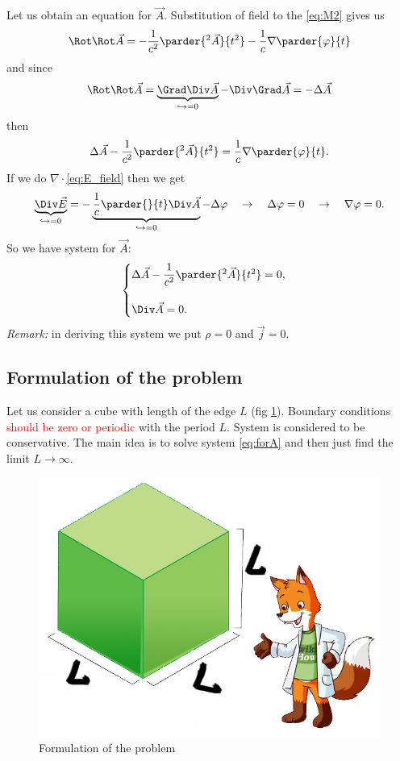 	Let us obtain an equation for $\vec{A}$. Substitution of field to the \eqref{eq:M2} gives us
	\begin{equation}
		\Rot \Rot \vec{A} = - \frac{1}{c^2} \parder{^2 \vec{A}}{t^2} - \frac{1}{c} \nabla \parder{\varphi}{t}
	\end{equation}
	and since
	\begin{equation}
		\Rot \Rot \vec{A} = \underbrace{\Grad \Div \vec{A}}_{\hookrightarrow = 0} - \Div \Grad \vec{A} = - \Delta \vec{A}
	\end{equation}
	then
	\begin{equation}
		\Delta \vec{A} - \frac{1}{c^2} \parder{^2 \vec{A}}{t^2} = \frac{1}{c} \nabla \parder{\varphi}{t}.
		\label{eq:temp1}
	\end{equation}
	If we do $\nabla\cdot$\eqref{eq:E_field} then we get
	\begin{equation}
		\underbrace{\Div \vec{E}}_{\hookrightarrow=0} = - \underbrace{\frac{1}{c} \parder{}{t} \Div \vec{A}}_{\hookrightarrow=0} - \Delta \varphi \quad \to \quad \Delta \varphi = 0 \quad \to \quad \nabla \varphi = 0.
	\end{equation}
	So we have system for $\vec{A}$:
	\begin{equation}
		\begin{cases}
			\Delta \vec{A} - \dfrac{1}{c^2} \parder{^2 \vec{A}}{t^2} = 0, \\ \\
			\Div \vec{A} = 0.
		\end{cases}
		\label{eq:forA}
	\end{equation}
	\textit{Remark:} in deriving this system we put $\rho = 0$ and $\vec{j} = 0$.
	
	\subsection{Formulation of the problem}
	
	Let us consider a cube with length of the edge $L$ (fig \ref{fig:cube}). Boundary conditions \textcolor{red}{should be zero or periodic} with the period $L$. System is considered to be conservative. The main idea is to solve system \eqref{eq:forA} and then just find the limit $L \to \infty$.
	
	\begin{figure}
		\centering
		\includegraphics[width=0.5\linewidth]{fig/L1/cube}
		\caption{Formulation of the problem}
		\label{fig:cube}
	\end{figure}

